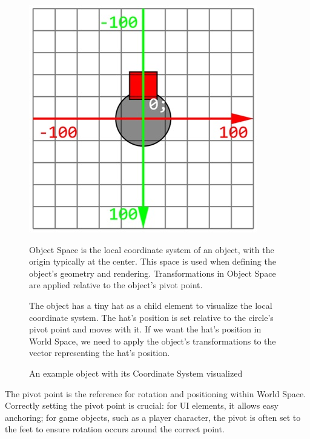 \begin{figure}[h]
    \centering
    \begin{minipage}[t]{0.35\textwidth}
        \includegraphics[width=\linewidth]{img/object-space.jpg}
        \caption{An example object with its Coordinate System visualized}
    \end{minipage}\hfill
    \begin{minipage}[b]{0.6\textwidth}
        \setlength{\parskip}{1em}
        \setlength{\parindent}{0pt}
        Object Space is the local coordinate system of an object, with the origin typically at the center. This space is used when defining the object's geometry and rendering. Transformations in Object Space are applied relative to the object's pivot point.

        The object has a tiny hat as a child element to visualize the local coordinate system. The hat's position is set relative to the circle's pivot point and moves with it. If we want the hat's position in World Space, we need to apply the object's transformations to the vector representing the hat's position.
    \end{minipage}
\end{figure}

\begin{Note}
    The pivot point is the reference for rotation and positioning within World Space. Correctly setting the pivot point is crucial: for UI elements, it allows easy anchoring; for game objects, such as a player character, the pivot is often set to the feet to ensure rotation occurs around the correct point.
\end{Note}

